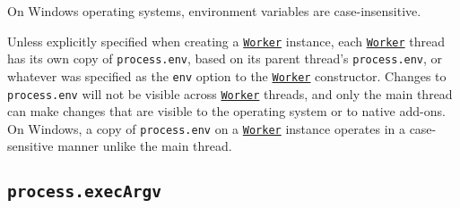 On Windows operating systems, environment variables are
case-insensitive.

\begin{Shaded}
\begin{Highlighting}[]
 \OperatorTok{;}

 \OperatorTok{=} \OperatorTok{;}
\NormalTok{)}\OperatorTok{;}
\end{Highlighting}
\end{Shaded}

\begin{Shaded}
\begin{Highlighting}[]
\OperatorTok{=} \NormalTok{(}\NormalTok{)}\OperatorTok{;}

 \OperatorTok{=} \OperatorTok{;}
\NormalTok{)}\OperatorTok{;}
\end{Highlighting}
\end{Shaded}

Unless explicitly specified when creating a
\href{worker_threads.md\#class-worker}{\texttt{Worker}} instance, each
\href{worker_threads.md\#class-worker}{\texttt{Worker}} thread has its
own copy of \texttt{process.env}, based on its parent thread's
\texttt{process.env}, or whatever was specified as the \texttt{env}
option to the \href{worker_threads.md\#class-worker}{\texttt{Worker}}
constructor. Changes to \texttt{process.env} will not be visible across
\href{worker_threads.md\#class-worker}{\texttt{Worker}} threads, and
only the main thread can make changes that are visible to the operating
system or to native add-ons. On Windows, a copy of \texttt{process.env}
on a \href{worker_threads.md\#class-worker}{\texttt{Worker}} instance
operates in a case-sensitive manner unlike the main thread.

\subsection{\texorpdfstring{\texttt{process.execArgv}}{process.execArgv}}\label{process.execargv}

